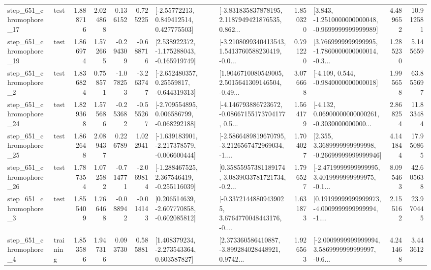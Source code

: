 \begin{tabular}{llrrrrllrlrr}
  step\_651\_chromophore\_17 &      test &      1.888716 &    2.024868 &      0.136152 &  0.725225 &     [-2.55772213, 0.849412514, 0.427775503] &  [-3.831835837878195, 2.1187949421876535, 0.862... &       1.850320 &  [3.843, -1.2510000000000048, -0.9699999999999989] &            4.489652 &         10.912581 \\
  step\_651\_chromophore\_19 &      test &      1.866974 &    1.572665 &     -0.294309 & -0.688716 &   [2.538922372, -1.175288043, -0.165919749] &  [-3.2108099340413543, 1.5413760588230419, -0.0... &       0.791220 &  [3.7669999999999995, -1.7860000000000014, -0.3... &            1.285230 &          5.145659 \\
   step\_651\_chromophore\_2 &      test &      1.836824 &    0.758571 &     -1.078253 & -3.263747 &    [-2.652480357, 0.25559817, -0.644319313] &  [1.9046710080549005, 2.5015641309146504, -0.49... &       3.076668 &               [-4.109, 0.544, -0.9840000000000018] &            1.995658 &         63.855697 \\
  step\_651\_chromophore\_24 &      test &      1.829368 &    1.575686 &     -0.253682 & -0.555267 &   [-2.709554895, 0.006586799, -0.068292188] &  [-4.146793886723672, -0.08667155173704177, 0.5... &       1.564179 &  [-4.132, 0.06900000000000261, -0.3030000000000... &            2.868254 &         11.833484 \\
  step\_651\_chromophore\_25 &      test &      1.862648 &    2.089437 &      0.226789 &  1.022941 &  [-1.639183901, -2.217378579, -0.006600444] &  [-2.5866489819670795, -3.2126567472969034, -1.... &       1.704027 &  [2.355, 3.3689999999999998, -0.26699999999999946] &            4.141844 &         17.950865 \\
  step\_651\_chromophore\_26 &      test &      1.787354 &    1.072582 &     -0.714771 & -2.069814 &   [-1.288467525, 2.367546419, -0.255116039] &  [0.35855957381189174, 3.0839033781721734, -0.2... &       1.796527 &  [-2.4719999999999995, 3.4019999999999975, -0.1... &            8.095463 &         42.605638 \\
   step\_651\_chromophore\_3 &      test &      1.855409 &    1.766468 &     -0.088942 & -0.014143 &   [0.206514639, -2.607770858, -0.602085812] &  [-0.33721448809439025, 3.6764770048443176, -0.... &       1.631873 &  [0.19199999999999973, -4.0009999999999994, -1.... &            2.155162 &         23.970445 \\
   step\_651\_chromophore\_4 &  training &      1.853586 &    1.947316 &      0.093730 &  0.585881 &    [1.408379234, -2.273543364, 0.603587827] &  [2.373360586410887, -3.899284028448921, 0.9742... &       1.926563 &  [-2.0009999999999994, 3.5869999999999997, -0.6... &            4.241468 &          3.443612 \\

\end{tabular}
